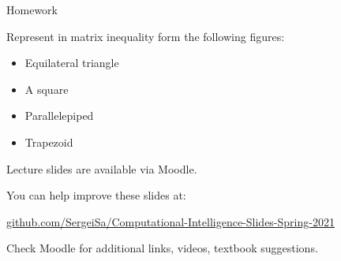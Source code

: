\documentclass{beamer}
\begin{document}
\begin{frame}{Homework}
\begin{flushleft}

Represent in matrix inequality form the following figures:

\begin{itemize}
    \item Equilateral triangle
    \item A square
    \item Parallelepiped
    \item Trapezoid
\end{itemize}

\end{flushleft}
\end{frame}







\begin{frame}
\centerline{Lecture slides are available via Moodle.}
\bigskip
\centerline{You can help improve these slides at:}
\centerline{
\textcolor{blue}{\href{https://github.com/SergeiSa/Computational-Intelligence-Slides-Spring-2021}{github.com/SergeiSa/Computational-Intelligence-Slides-Spring-2021}}
}
\bigskip

\textcolor{black}{}
\bigskip

\centerline{Check Moodle for additional links, videos, textbook suggestions.}
\end{frame}
\end{document}
